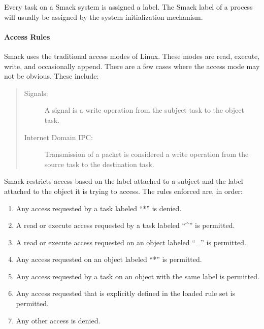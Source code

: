\documentclass[a4paper,8pt,english]{sphinxmanual}
\begin{document}
Every task on a Smack system is assigned a label. The Smack label
of a process will usually be assigned by the system initialization
mechanism.


\paragraph{Access Rules}
\label{admin-guide/LSM/Smack:access-rules}
Smack uses the traditional access modes of Linux. These modes are read,
execute, write, and occasionally append. There are a few cases where the
access mode may not be obvious. These include:
\begin{quote}
\begin{description}
\item[{Signals:}] \leavevmode
A signal is a write operation from the subject task to
the object task.

\item[{Internet Domain IPC:}] \leavevmode
Transmission of a packet is considered a
write operation from the source task to the destination task.

\end{description}
\end{quote}

Smack restricts access based on the label attached to a subject and the label
attached to the object it is trying to access. The rules enforced are, in
order:
\begin{enumerate}
\item {} 
Any access requested by a task labeled ``*'' is denied.

\item {} 
A read or execute access requested by a task labeled ``\textasciicircum{}''
is permitted.

\item {} 
A read or execute access requested on an object labeled ``\_''
is permitted.

\item {} 
Any access requested on an object labeled ``*'' is permitted.

\item {} 
Any access requested by a task on an object with the same
label is permitted.

\item {} 
Any access requested that is explicitly defined in the loaded
rule set is permitted.

\item {} 
Any other access is denied.

\end{enumerate}
\end{document}
